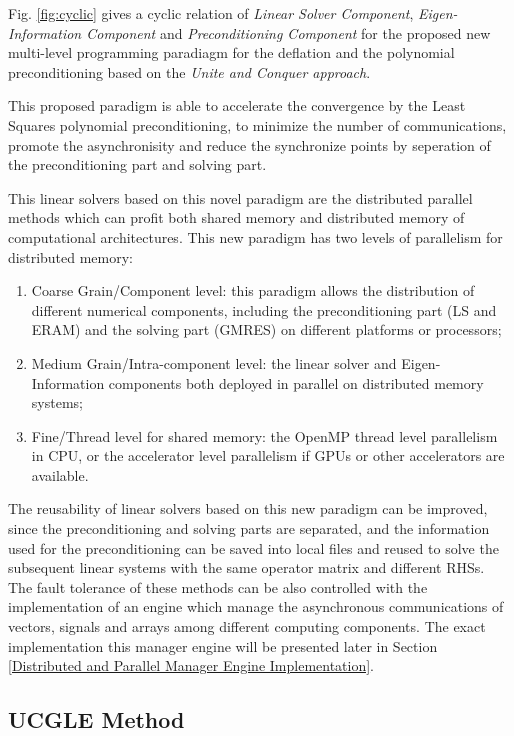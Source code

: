 Fig. \ref{fig:cyclic} gives a cyclic relation of \textit{Linear Solver Component}, \textit{Eigen-Information Component} and \textit{Preconditioning Component} for the proposed new multi-level programming paradiagm for the deflation and the polynomial preconditioning based on the \textit{Unite and Conquer approach}.

This proposed paradigm is able to accelerate the convergence by the Least Squares polynomial preconditioning, to minimize the number of communications, promote the asynchronisity and reduce the synchronize points by seperation of the preconditioning part and solving part.

This linear solvers based on this novel paradigm are the distributed parallel methods which can profit both shared memory and distributed memory of computational architectures. This new paradigm has two levels of parallelism for distributed memory:

\begin{enumerate}
	\item Coarse Grain/Component level: this paradigm allows the distribution of different numerical components, including the preconditioning part (LS and ERAM) and the solving part (GMRES) on different platforms or processors;
	\item Medium Grain/Intra-component level: the linear solver and Eigen-Information components both deployed in parallel on distributed memory systems;
	\item Fine/Thread level for shared memory: the OpenMP thread level parallelism in CPU, or the accelerator level parallelism if GPUs or other accelerators are available. 
\end{enumerate} 

The reusability of linear solvers based on this new paradigm can be improved, since the preconditioning and solving parts are separated, and the information used for the preconditioning can be saved into local files and reused to solve the subsequent linear systems with the same operator matrix and different RHSs. The fault tolerance of these methods can be also controlled with the implementation of an engine which manage the asynchronous communications of vectors, signals and arrays among different computing components. The exact implementation this manager engine will be presented later in Section \ref{Distributed and Parallel Manager Engine Implementation}.

\subsection{UCGLE Method} \label{UCGLE}

